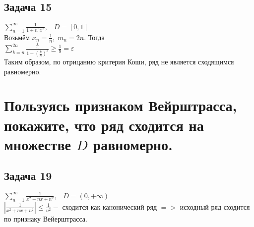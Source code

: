 \documentclass[a4paper, fleqn]{article}
\begin{document}
    \subsection*{Задача 15}
    $\sum\limits_{n = 1}^{\infty} \frac{1}{1 + n^3x^3}, \; \; \; D = [0, 1]$ \\
    Возьмём $x_n = \frac{1}{n}, \; m_n = 2n$. Тогда \\
    $\sum\limits_{k = n}^{2n} \frac{\frac{1}{n}}{1 + (\frac{k}{n})^3} \geq \frac{1}{9} = \varepsilon$ \\
    Таким образом, по отрицанию критерия Коши, ряд не является сходящимся равномерно. \\
    
    
    
    
    \section*{Пользуясь признаком Вейрштрасса, покажите, что ряд сходится на множестве $D$ равномерно.}
    \subsection*{Задача 19}
    $\sum\limits_{n = 1}^{\infty} \frac{1}{x^2 + nx + n^2}, \; \; \; D = (0, +\infty)$ \\
    $\left| \frac{1}{x^2 + nx + n^2} \right| \leq \frac{1}{n^2} - $ сходится как канонический ряд $=>$ исходный ряд сходится по признаку Вейерштрасса. \\

    
\end{document}
